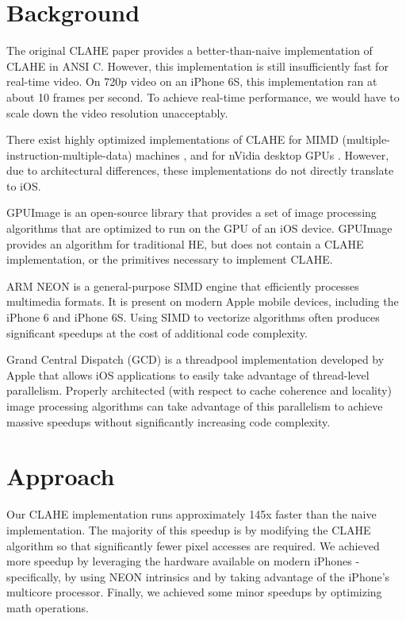 \documentclass[10pt,twocolumn,letterpaper]{article}
\begin{document}
\section{Background}

The original CLAHE paper \cite{Zuiderveld} provides a better-than-naive implementation of CLAHE in ANSI C. However, this implementation is still insufficiently fast for real-time video. On 720p video on an iPhone 6S, this implementation ran at about 10 frames per second. To achieve real-time performance, we would have to scale down the video resolution unacceptably.

There exist highly optimized implementations of CLAHE for MIMD (multiple-instruction-multiple-data) machines \cite{Kurak}, and for nVidia desktop GPUs \cite{Hillaire}. However, due to architectural differences, these implementations do not directly translate to iOS.

GPUImage is an open-source library that provides a set of image processing algorithms that are optimized to run on the GPU of an iOS device. GPUImage provides an algorithm for traditional HE, but does not contain a CLAHE implementation, or the primitives necessary to implement CLAHE.

ARM NEON is a general-purpose SIMD engine that efficiently processes multimedia formats. It is present on modern Apple mobile devices, including the iPhone 6 and iPhone 6S. Using SIMD to vectorize algorithms often produces significant speedups at the cost of additional code complexity.

Grand Central Dispatch (GCD) is a threadpool implementation developed by Apple that allows iOS applications to easily take advantage of thread-level parallelism. Properly architected (with respect to cache coherence and locality) image processing algorithms can take advantage of this parallelism to achieve massive speedups without significantly increasing code complexity.

\section{Approach}

Our CLAHE implementation runs approximately 145x faster than the naive implementation. The majority of this speedup is by modifying the CLAHE algorithm so that significantly fewer pixel accesses are required. We achieved more speedup by leveraging the hardware available on modern iPhones - specifically, by using NEON intrinsics and by taking advantage of the iPhone's multicore processor. Finally, we achieved some minor speedups by optimizing math operations.
\end{document}
